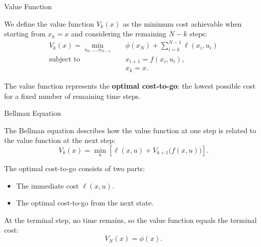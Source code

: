 \documentclass{beamer}
\begin{document}
\begin{frame}{Value Function}
	\begin{flushleft}
		
		We define the value function $V_k(x)$ as the minimum
		cost achievable when starting from $x_k=x$ and
		considering the remaining $N-k$ steps:
		\[
		\begin{aligned}
			V_k(x)=\min_{u_k,\ldots,u_{N-1}}\quad
			&\phi(x_N)+\sum_{i=k}^{N-1}\ell(x_i,u_i)\\
			\text{subject to}\quad
			&x_{i+1}=f(x_i,u_i),\\
			&x_k=x.
		\end{aligned}
		\]
		
		\medskip
		
		The value function represents the \textbf{optimal
			cost-to-go}: the lowest possible cost for a fixed
		number of remaining time steps.
		
	\end{flushleft}
\end{frame}

\begin{frame}{Bellman Equation}
	\begin{flushleft}
		
		The Bellman equation describes how the value function
		at one step is related to the value function at the
		next step:
		\[
		\boxed{
			V_k(x)=\min_u
			\left[
			\ell(x,u)+V_{k+1}\bigl(f(x,u)\bigr)
			\right].
		}
		\]
		
		\medskip
		
		The optimal cost-to-go consists of two parts:
		\begin{itemize}
			\item The immediate cost $\ell(x,u)$.
			\item The optimal cost-to-go from the next state.
		\end{itemize}
		
		\medskip
		
		At the terminal step, no time remains, so the value
		function equals the terminal cost:
		\[
		V_N(x)=\phi(x).
		\]
		
	\end{flushleft}
\end{frame}
\end{document}

